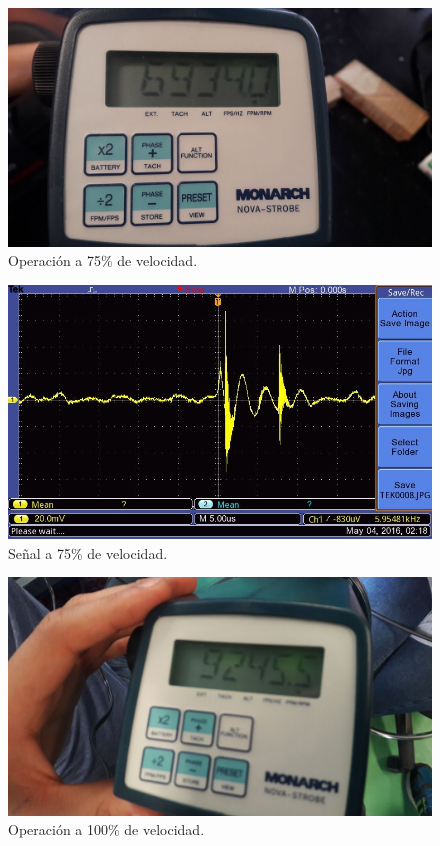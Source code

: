   \begin{figure}[!htbp]
 \centering
 \includegraphics [scale=0.2]
 {./img/6934.jpg}
  \caption{Operaci\'on a 75\% de velocidad.}
 \end{figure}

  \begin{figure}[!htbp]
 \centering
 \includegraphics [scale=0.25]
 {./img/tek0008.jpg}
  \caption{Se\~nal a 75\% de velocidad.}
 \end{figure}

  \begin{figure}[!htbp]
 \centering
 \includegraphics [scale=0.2]
 {./img/9245.jpg}
  \caption{Operaci\'on a 100\% de velocidad.}
 \end{figure}

